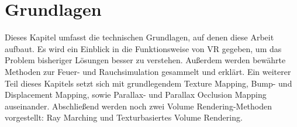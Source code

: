 \section{Grundlagen}
\label{sec:3}
Dieses Kapitel umfasst die technischen Grundlagen, auf denen diese Arbeit aufbaut. 
Es wird ein Einblick in die Funktionsweise von VR gegeben, um das Problem bisheriger Lösungen 
besser zu verstehen. Außerdem werden bewährte Methoden zur Feuer- und Rauchsimulation
gesammelt und erklärt. Ein weiterer Teil dieses Kapitels setzt sich mit grundlegendem Texture Mapping,
Bump- und Displacement Mapping, sowie Parallax- und Parallax Occlusion Mapping auseinander. Abschließend 
werden noch zwei Volume Rendering-Methoden vorgestellt: Ray Marching und Texturbasiertes Volume Rendering.







